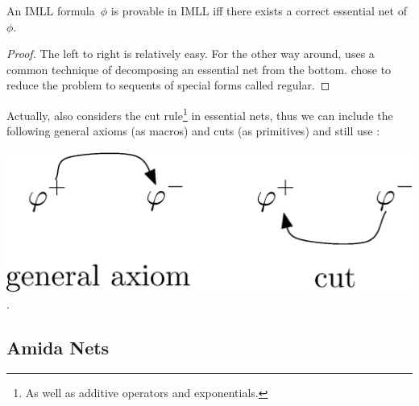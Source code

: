 \begin{theorem}
  \label{essential-ok}
  An IMLL formula~$\phi$ is provable in IMLL iff there exists a correct essential net
  of $\phi$.
 \end{theorem}
 \begin{proof}
  The left to right is relatively easy.  For the other way around,
  \citet{lamarche2008} uses a common technique of decomposing an
  essential net from the bottom.
  \citet{murawski2003} chose to reduce the problem to sequents of special forms
  called regular.
 \end{proof}

 Actually, \citet{lamarche2008} also considers the cut rule\footnote{As well as
 additive operators and exponentials.} in essential nets, thus
 we can include the following general axioms (as macros) and cuts (as
 primitives) and still use :
 \begin{center}
  \includegraphics[scale=0.4]{general-axiom-cut.eps}\enspace.
 \end{center}

\subsection{Amida Nets}

